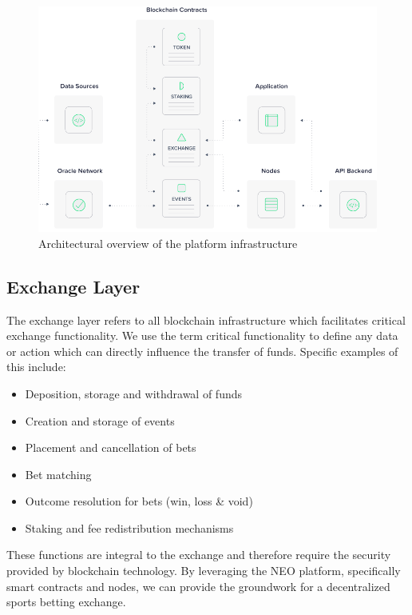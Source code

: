 \documentclass{article}
\begin{document}
\begin{figure}[!htb]
\centering
\includegraphics[scale=.35]{./images/architecture-diagram.png}
\caption{Architectural overview of the platform infrastructure}
\label{figure:architecture}
\end{figure}


	\subsection{Exchange Layer}

The exchange layer refers to all blockchain infrastructure which facilitates critical exchange functionality. We use the term critical functionality to define any data or action which can directly influence the transfer of funds. Specific examples of this include:

\begin{itemize}
	\item Deposition, storage and withdrawal of funds
	\item Creation and storage of events
	\item Placement and cancellation of bets
	\item Bet matching
	\item Outcome resolution for bets (win, loss \& void)
	\item Staking and fee redistribution mechanisms
\end{itemize}

These functions are integral to the exchange and therefore require the security provided by blockchain technology. By leveraging the NEO platform, specifically smart contracts and nodes, we can provide the groundwork for a decentralized sports betting exchange.
\end{document}
